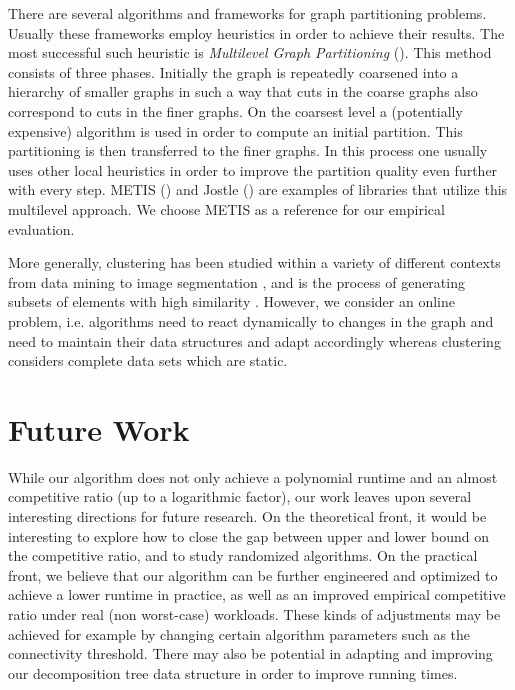 \documentclass[a4paper,UKenglish,cleveref, autoref, thm-restate,authorcolumns]{lipics-v2019}
\begin{document}
There are several algorithms and frameworks for graph partitioning problems. Usually these frameworks employ heuristics in order to achieve their results. The most successful such heuristic is \textit{Multilevel Graph Partitioning} (\cite{Buluc2016}). This method consists of three phases. Initially the graph is repeatedly coarsened into a hierarchy of smaller graphs in such a way that cuts in the coarse graphs also correspond to cuts in the finer graphs. On the coarsest level a (potentially expensive) algorithm is used in order to compute an initial partition. This partitioning is then transferred to the finer graphs. In this process one usually uses other local heuristics in order to improve the partition quality even further with every step.
METIS (\cite{Karypis1998, Karypis1998a}) and Jostle (\cite{Walshaw2000, walshaw2007jostle}) are examples of libraries that utilize this multilevel approach. We choose METIS as a reference for our empirical evaluation.

More generally, clustering has been studied within a variety of
different contexts 
from data mining to image segmentation \cite{Benabdellah2019, Wu1993, Pavana},
and is the process of generating subsets of elements with high similarity 
\cite{Hartuv2000}. 
However, we consider an online problem, i.e. algorithms need to react dynamically to changes in the graph and need to maintain their data structures and adapt accordingly whereas clustering considers complete data sets which are static.

\section{Future Work}
	\label{sec:future_work}
	
While our algorithm does not only achieve a polynomial runtime
and an almost competitive ratio (up to a logarithmic factor),
our work leaves upon several interesting directions for future
research. 
On the theoretical front, it would be interesting to explore
how to close the gap between upper and lower bound
on the competitive ratio, and to study randomized algorithms.
On the practical front, we believe that our algorithm can
be further engineered and optimized to achieve a lower runtime
in practice, as well as an improved empirical competitive ratio
under real (non worst-case) workloads.
These kinds of adjustments may be achieved for example by changing certain algorithm parameters such as the connectivity threshold.
There may also be potential in adapting and improving our decomposition tree data structure in order to improve running times.

\appendix



\end{document}
